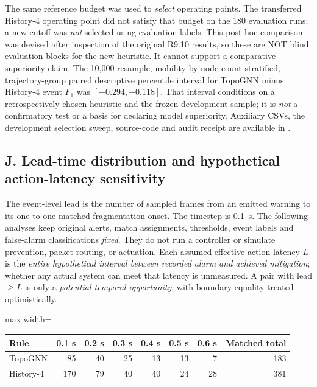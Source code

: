 \documentclass[10pt,a4paper]{article}
\begin{document}
\noindent The same reference budget was used to \emph{select} operating points. The transferred History-4 operating point did not satisfy that budget on the 180 evaluation runs; a new cutoff was \emph{not} selected using evaluation labels. This post-hoc comparison was devised after inspection of the original R9.10 results, so these are NOT blind evaluation blocks for the new heuristic. It cannot support a comparative superiority claim. The 10,000-resample, mobility-by-node-count-stratified, trajectory-group paired descriptive percentile interval for TopoGNN minus History-4 event $F_1$ was $[-0.294,-0.118]$. That interval conditions on a retrospectively chosen heuristic and the frozen development sample; it is \emph{not} a confirmatory test or a basis for declaring model superiority. Auxiliary CSVs, the development selection sweep, source-code and audit receipt are available in .

\newpage
\subsection*{J. Lead-time distribution and hypothetical action-latency sensitivity}
\noindent The event-level lead is the number of sampled frames from an emitted warning to its one-to-one matched fragmentation onset. The timestep is 0.1~s. The following analyses keep original alerts, match assignments, thresholds, event labels and false-alarm classifications \emph{fixed}. They do not run a controller or simulate prevention, packet routing, or actuation. Each assumed effective-action latency $L$ is the \emph{entire hypothetical interval between recorded alarm and achieved mitigation}; whether any actual system can meet that latency is unmeasured. A pair with lead $\geq L$ is only a \emph{potential temporal opportunity}, with boundary equality treated optimistically.

\begin{center}
\small
\setlength{\tabcolsep}{6pt}
\begin{adjustbox}{max width=\linewidth}\begin{tabular}{lrrrrrrr}
\toprule
Rule & 0.1 s & 0.2 s & 0.3 s & 0.4 s & 0.5 s & 0.6 s & Matched total \\
\midrule
TopoGNN & 85 & 40 & 25 & 13 & 13 & 7 & 183 \\
History-4 & 170 & 79 & 40 & 40 & 24 & 28 & 381 \\
\bottomrule
\end{tabular}\end{adjustbox}
\end{center}
\end{document}
